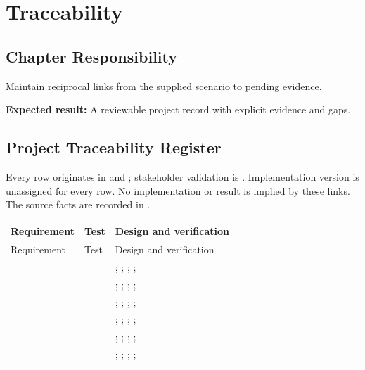\chapter{Traceability}
\section{Chapter Responsibility}
\label{Section:TraceabilityResponsibility}
Maintain reciprocal links from the supplied scenario to pending evidence.

\noindent\textbf{Expected result:} A reviewable project record with explicit evidence and gaps.


\section{Project Traceability Register}
Every row originates in  and ; stakeholder validation is . Implementation version is unassigned for every row. No implementation or result is implied by these links. The source facts are recorded in .
\small
\begin{tabularx}{\linewidth}{L{2.5cm}L{2.0cm}Y}
\caption{Traceability Register\label{Table:TraceabilityMatrix}}\\
\toprule
Requirement & Test & Design and verification\\\midrule
\endfirsthead
\toprule
Requirement & Test & Design and verification\\\midrule
\endhead
\bottomrule
\endlastfoot
{} &  & ; ; ; ; \\
 &  & ; ; ; ; \\
 &  & ; ; ; ; \\
 &  & ; ; ; ; \\
 &  & ; ; ; ; \\
 &  & ; ; ; ; \\
\end{tabularx}
\normalsize
